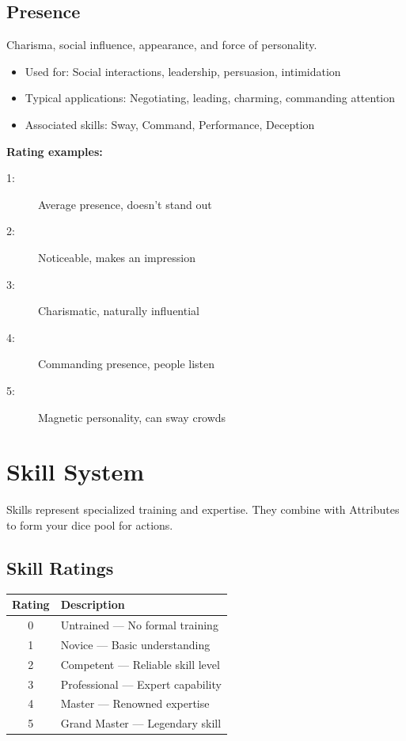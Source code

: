 \documentclass[11pt,twoside,openany]{book}
\begin{document}
\subsection*{Presence}

Charisma, social influence, appearance, and force of personality.
\begin{itemize}
\item Used for: Social interactions, leadership, persuasion, intimidation
\item Typical applications: Negotiating, leading, charming, commanding attention
\item Associated skills: Sway, Command, Performance, Deception
\end{itemize}

\textbf{Rating examples:}
\begin{description}
\item[1:] Average presence, doesn't stand out
\item[2:] Noticeable, makes an impression
\item[3:] Charismatic, naturally influential
\item[4:] Commanding presence, people listen
\item[5:] Magnetic personality, can sway crowds
\end{description}

\section*{Skill System} 

Skills represent specialized training and expertise. They combine with Attributes to form your dice pool for actions.

\subsection*{Skill Ratings}

\begin{center}
\begin{tabular}{|c|l|}
\hline
\textbf{Rating} & \textbf{Description} \\
\hline
0 & Untrained --- No formal training \\
1 & Novice --- Basic understanding \\
2 & Competent --- Reliable skill level \\
3 & Professional --- Expert capability \\
4 & Master --- Renowned expertise \\
5 & Grand Master --- Legendary skill \\
\hline
\end{tabular}
\end{center}
\end{document}
